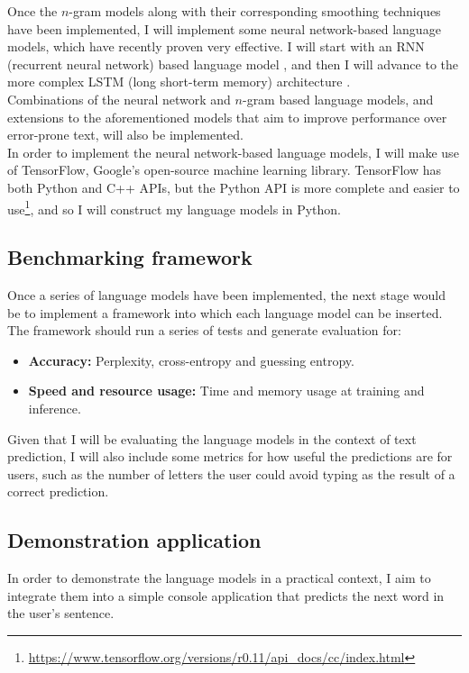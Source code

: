 \documentclass[a4paper, 12pt]{article}
\newcommand{\tbf}[1]{\textbf{#1}}
\newcommand{\hlink}[2]{{\href{#1}{#2}}}
\begin{document}
Once the $n$-gram models along with their corresponding smoothing techniques have been implemented, I will implement some neural network-based language models, which have recently proven very effective. I will start with an RNN (recurrent neural network) based language model \cite{mikolov}, and then I will advance to the more complex LSTM (long short-term memory) architecture \cite{lstm}. \\

Combinations of the neural network and $n$-gram based language models, and extensions to the aforementioned models that aim to improve performance over error-prone text, will also be implemented. \\

In order to implement the neural network-based language models, I will make use of TensorFlow, Google's open-source machine learning library. TensorFlow has both Python and C++ APIs, but the Python API is more complete and easier to use\footnote{\hlink{https://www.tensorflow.org/versions/r0.11/api\_docs/cc/index.html}{https://www.tensorflow.org/versions/r0.11/api\_docs/cc/index.html}}, and so I will construct my language models in Python.

\subsection*{Benchmarking framework}
Once a series of language models have been implemented, the next stage would be to implement a framework into which each language model can be inserted. The framework should run a series of tests and generate evaluation for:
\begin{itemize}
\item
	\tbf{Accuracy:} Perplexity, cross-entropy and guessing entropy.
\item
	\tbf{Speed and resource usage:} Time and memory usage at training and inference.
\end{itemize}
Given that I will be evaluating the language models in the context of text prediction, I will also include some metrics for how useful the predictions are for users, such as the number of letters the user could avoid typing as the result of a correct prediction. 

\subsection*{Demonstration application}
In order to demonstrate the language models in a practical context, I aim to integrate them into a simple console application that predicts the next word in the user's sentence.
\end{document}

